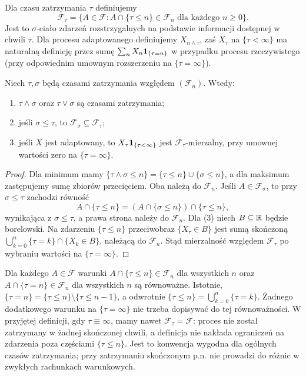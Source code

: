 \begin{definicja}
Dla czasu zatrzymania $\tau$ definiujemy
\[
\mathcal F_\tau=
\{A\in\mathcal F: A\cap\{\tau\leq n\}\in\mathcal F_n
\text{ dla każdego }n\geq0\}.
\]
Jest to $\sigma$-ciało zdarzeń rozstrzygalnych
na podstawie informacji dostępnej w chwili $\tau$.
Dla procesu adaptowanego definiujemy
$X_{n\wedge\tau}$, zaś $X_\tau$ na $\{\tau<\infty\}$
ma naturalną definicję przez sumę
$\sum_n X_n\mathbf{1}_{\{\tau=n\}}$ w przypadku
procesu rzeczywistego (przy odpowiednim umownym
rozszerzeniu na $\{\tau=\infty\}$).
\end{definicja}

\begin{lemat}
Niech $\tau,\sigma$ będą czasami zatrzymania
względem $(\mathcal F_n)$. Wtedy:
\begin{enumerate}
\item $\tau\wedge\sigma$ oraz $\tau\vee\sigma$ są czasami zatrzymania;
\item jeśli $\sigma\leq\tau$, to $\mathcal F_\sigma\subseteq\mathcal F_\tau$;
\item jeśli $X$ jest adaptowany, to $X_\tau\mathbf{1}_{\{\tau<\infty\}}$
  jest $\mathcal F_\tau$-mierzalny, przy umownej wartości zero na $\{\tau=\infty\}$.
\end{enumerate}
\end{lemat}
\begin{proof}
Dla minimum mamy
$\{\tau\wedge\sigma\leq n\}=
\{\tau\leq n\}\cup\{\sigma\leq n\}$,
a dla maksimum zastępujemy sumę zbiorów
przecięciem. Oba należą do $\mathcal F_n$.
Jeśli $A\in\mathcal F_\sigma$, to przy
$\sigma\leq\tau$ zachodzi równość
\[
A\cap\{\tau\leq n\}
=(A\cap\{\sigma\leq n\})\cap\{\tau\leq n\},
\]
wynikająca z $\sigma\leq\tau$, a prawa strona
należy do $\mathcal F_n$.
Dla (3) niech $B\subseteq\mathbb{R}$ będzie borelowski.
Na zdarzeniu $\{\tau\leq n\}$ przeciwobraz
$\{X_\tau\in B\}$ jest sumą skończoną
$\bigcup_{k=0}^n\{\tau=k\}\cap\{X_k\in B\}$,
należącą do $\mathcal F_n$. Stąd mierzalność
względem $\mathcal F_\tau$ po wybraniu
wartości na $\{\tau=\infty\}$.
\end{proof}

\begin{uwaga}
Dla każdego $A\in\mathcal F$ warunki
$A\cap\{\tau\leq n\}\in\mathcal F_n$ dla wszystkich $n$
oraz $A\cap\{\tau=n\}\in\mathcal F_n$ dla wszystkich $n$
są równoważne. Istotnie, $\{\tau=n\}=\{\tau\leq n\}
\setminus\{\tau\leq n-1\}$, a odwrotnie
$\{\tau\leq n\}=\bigcup_{k=0}^n\{\tau=k\}$.
Żadnego dodatkowego warunku na $\{\tau=\infty\}$
nie trzeba dopisywać do tej równoważności.
W przyjętej definicji, gdy $\tau\equiv\infty$,
mamy nawet $\mathcal F_\tau=\mathcal F$:
proces nie został zatrzymany w żadnej skończonej chwili,
a definicja nie nakłada ograniczeń na zdarzenia
poza częściami $\{\tau\leq n\}$. Jest to konwencja
wygodna dla ogólnych czasów zatrzymania;
przy zatrzymaniu skończonym p.n. nie prowadzi do
różnic w zwykłych rachunkach warunkowych.
\end{uwaga}


